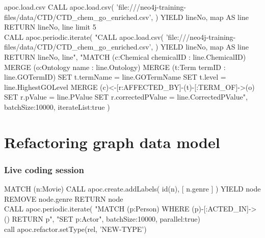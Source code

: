 \documentclass[12pt]{beamer}
\begin{document}
    \begin{frame}{apoc.load.csv}
        CALL apoc.load.csv(
        'file:///neo4j-training-files/data/CTD/CTD\_chem\_go\_enriched.csv',
        {})
        YIELD lineNo, map AS line RETURN lineNo, line limit 5\\
        
        CALL apoc.periodic.iterate(
        "CALL apoc.load.csv(
        'file:///neo4j-training-files/data/CTD/CTD\_chem\_go\_enriched.csv',
        {})
        YIELD lineNo, map AS line RETURN lineNo, line",
        "MATCH (c:Chemical {chemicalID : line.ChemicalID})
        MERGE (o:Ontology {name : line.Ontology})
        MERGE (t:Term {termID : line.GOTermID})
        SET t.termName = line.GOTermName
        SET t.level = line.HighestGOLevel
        MERGE (c)<-[r:AFFECTED\_BY]-(t)-[:TERM\_OF]->(o)
        SET r.pValue = line.PValue
        SET r.correctedPValue = line.CorrectedPValue",
        {batchSize:10000, iterateList:true}
        )
    \end{frame}
    
    
    \section{Refactoring graph data model}
    \begin{frame}
        \frametitle{Live coding session}
        MATCH (n:Movie)
        CALL apoc.create.addLabels( id(n), [ n.genre ] ) YIELD node
        REMOVE node.genre
        RETURN node
        \\
        CALL apoc.periodic.iterate(
        "MATCH (p:Person) WHERE (p)-[:ACTED\_IN]->() RETURN p",
        "SET p:Actor", {batchSize:10000, parallel:true})
        \\
        call apoc.refactor.setType(rel, 'NEW-TYPE')
    \end{frame}
    
\end{document}
